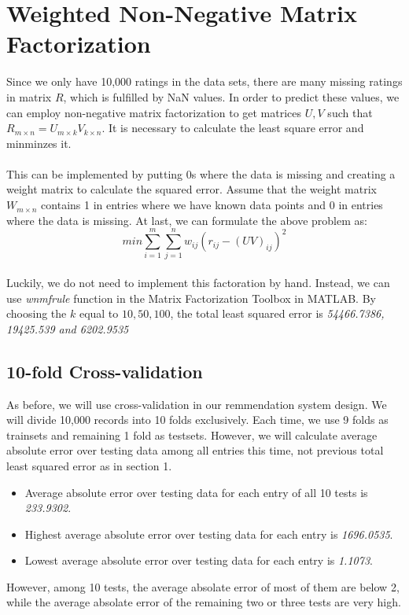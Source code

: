\documentclass{article}
\begin{document}
\section{Weighted Non-Negative Matrix Factorization}
Since we only have 10,000 ratings in the data sets, there are many missing ratings in matrix $R$, which is fulfilled by NaN values. In order to predict these values, we can employ non-negative matrix factorization to get matrices $U, V$ such that $R_{m \times n}=U_{m \times k}V_{k \times n}$. It is necessary to calculate the least square error and minminzes it.\\
\\
This can be implemented by putting 0s where the data is missing and creating a weight matrix to calculate the squared error. Assume that the weight matrix $W_{m \times n}$ contains 1 in entries where we have known data points and 0 in entries where the data is missing. At last, we can formulate the above problem as:
\begin{equation}
min\sum_{i=1}^{m}\sum_{j=1}^{n}w_{ij}{(r_{ij}-{(UV)}_{ij})}^2
\end{equation}
\\
Luckily, we do not need to implement this factoration by hand. Instead, we can use \emph{wnmfrule} function in the Matrix Factorization Toolbox in MATLAB. By choosing the $k$ equal to $10, 50, 100$, the total least squared error is \emph{54466.7386, 19425.539 and 6202.9535}
\subsection{10-fold Cross-validation}
As before, we will use cross-validation in our remmendation system design. We will divide 10,000 records into 10 folds exclusively. Each time, we use 9 folds as trainsets and remaining 1 fold as testsets. However, we will calculate average absolute error over testing data among all entries this time, not previous total least squared error as in section 1.\\
\begin{itemize}
\item Average absolute error over testing data for each entry of all 10 tests is \emph{233.9302}.
\item Highest average absolute error over testing data for each entry is \emph{1696.0535}.
\item Lowest average absolute error over testing data for each entry is \emph{1.1073}.
\end{itemize}
However, among 10 tests, the average absolate error of most of them are below 2, while the average absolate error of the remaining two or three tests are very high.
\end{document}
